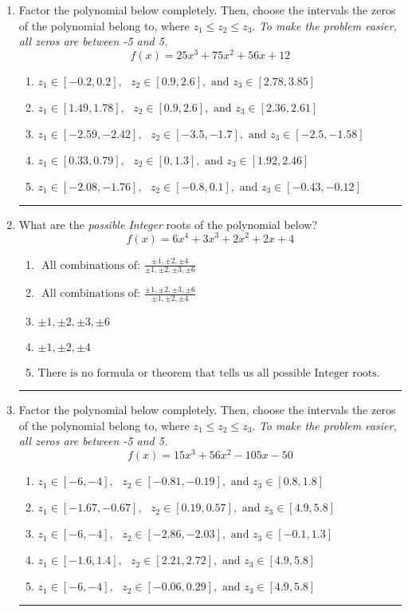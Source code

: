 \documentclass[14pt]{extbook}
\newcommand{\litem}[1]{\item#1\hspace*{-1cm}\rule{\textwidth}{0.4pt}}
\begin{document}
\begin{enumerate}
{\begin{enumerate}[label=\Alph*.]
\end{enumerate} }
\litem{
Factor the polynomial below completely. Then, choose the intervals the zeros of the polynomial belong to, where $z_1 \leq z_2 \leq z_3$. \textit{To make the problem easier, all zeros are between -5 and 5.}\[ f(x) = 25x^{3} +75 x^{2} +56 x + 12 \]\begin{enumerate}[label=\Alph*.]
\item \( z_1 \in [-0.2, 0.2], \text{   }  z_2 \in [0.9, 2.6], \text{   and   } z_3 \in [2.78, 3.85] \)
\item \( z_1 \in [1.49, 1.78], \text{   }  z_2 \in [0.9, 2.6], \text{   and   } z_3 \in [2.36, 2.61] \)
\item \( z_1 \in [-2.59, -2.42], \text{   }  z_2 \in [-3.5, -1.7], \text{   and   } z_3 \in [-2.5, -1.58] \)
\item \( z_1 \in [0.33, 0.79], \text{   }  z_2 \in [0, 1.3], \text{   and   } z_3 \in [1.92, 2.46] \)
\item \( z_1 \in [-2.08, -1.76], \text{   }  z_2 \in [-0.8, 0.1], \text{   and   } z_3 \in [-0.43, -0.12] \)

\end{enumerate} }
\litem{
What are the \textit{possible Integer} roots of the polynomial below?\[ f(x) = 6x^{4} +3 x^{3} +2 x^{2} +2 x + 4 \]\begin{enumerate}[label=\Alph*.]
\item \( \text{ All combinations of: }\frac{\pm 1,\pm 2,\pm 4}{\pm 1,\pm 2,\pm 3,\pm 6} \)
\item \( \text{ All combinations of: }\frac{\pm 1,\pm 2,\pm 3,\pm 6}{\pm 1,\pm 2,\pm 4} \)
\item \( \pm 1,\pm 2,\pm 3,\pm 6 \)
\item \( \pm 1,\pm 2,\pm 4 \)
\item \( \text{There is no formula or theorem that tells us all possible Integer roots.} \)

\end{enumerate} }
\litem{
Factor the polynomial below completely. Then, choose the intervals the zeros of the polynomial belong to, where $z_1 \leq z_2 \leq z_3$. \textit{To make the problem easier, all zeros are between -5 and 5.}\[ f(x) = 15x^{3} +56 x^{2} -105 x -50 \]\begin{enumerate}[label=\Alph*.]
\item \( z_1 \in [-6, -4], \text{   }  z_2 \in [-0.81, -0.19], \text{   and   } z_3 \in [0.8, 1.8] \)
\item \( z_1 \in [-1.67, -0.67], \text{   }  z_2 \in [0.19, 0.57], \text{   and   } z_3 \in [4.9, 5.8] \)
\item \( z_1 \in [-6, -4], \text{   }  z_2 \in [-2.86, -2.03], \text{   and   } z_3 \in [-0.1, 1.3] \)
\item \( z_1 \in [-1.6, 1.4], \text{   }  z_2 \in [2.21, 2.72], \text{   and   } z_3 \in [4.9, 5.8] \)
\item \( z_1 \in [-6, -4], \text{   }  z_2 \in [-0.06, 0.29], \text{   and   } z_3 \in [4.9, 5.8] \)


\end{enumerate}}
\end{enumerate}
\end{document}
